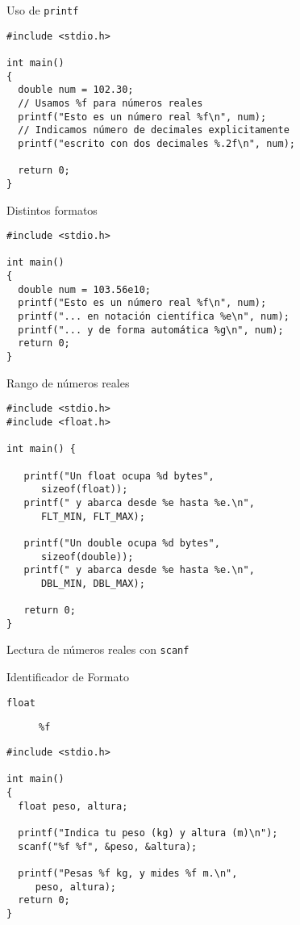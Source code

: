 \documentclass[xcolor={usenames,svgnames,dvipsnames}, aspectratio=169]{beamer}
\begin{document}
\begin{frame}[label={sec:org774464f},fragile]{Uso de \texttt{printf}}
 \lstset{language=C,label= ,caption= ,captionpos=b,numbers=none}
\begin{lstlisting}
#include <stdio.h>

int main()
{
  double num = 102.30;
  // Usamos %f para números reales
  printf("Esto es un número real %f\n", num);
  // Indicamos número de decimales explicitamente
  printf("escrito con dos decimales %.2f\n", num);

  return 0;
}
\end{lstlisting}
\end{frame}

\begin{frame}[label={sec:org409f875},fragile]{Distintos formatos}
 \lstset{language=C,label= ,caption= ,captionpos=b,numbers=none}
\begin{lstlisting}
#include <stdio.h>

int main()
{
  double num = 103.56e10;
  printf("Esto es un número real %f\n", num);
  printf("... en notación científica %e\n", num);
  printf("... y de forma automática %g\n", num);
  return 0;
}
\end{lstlisting}
\end{frame}

\begin{frame}[label={sec:org35c2318},fragile]{Rango de números reales}
 \lstset{language=C,label= ,caption= ,captionpos=b,numbers=none}
\begin{lstlisting}
#include <stdio.h>
#include <float.h>

int main() {

   printf("Un float ocupa %d bytes",
	  sizeof(float));
   printf(" y abarca desde %e hasta %e.\n",
	  FLT_MIN, FLT_MAX);

   printf("Un double ocupa %d bytes",
	  sizeof(double));
   printf(" y abarca desde %e hasta %e.\n",
	  DBL_MIN, DBL_MAX);

   return 0;
}
\end{lstlisting}
\end{frame}


\begin{frame}[label={sec:org831da0f},fragile]{Lectura de números reales con \texttt{scanf}}
 \begin{block}{Identificador de Formato}
\begin{description}
\item[{\texttt{float}}] \texttt{\%f}
\end{description}

\lstset{language=C,label= ,caption= ,captionpos=b,numbers=none}
\begin{lstlisting}
#include <stdio.h>

int main()
{
  float peso, altura;

  printf("Indica tu peso (kg) y altura (m)\n");
  scanf("%f %f", &peso, &altura);

  printf("Pesas %f kg, y mides %f m.\n",
	 peso, altura);
  return 0;
}
\end{lstlisting}
\end{block}
\end{frame}
\end{document}
